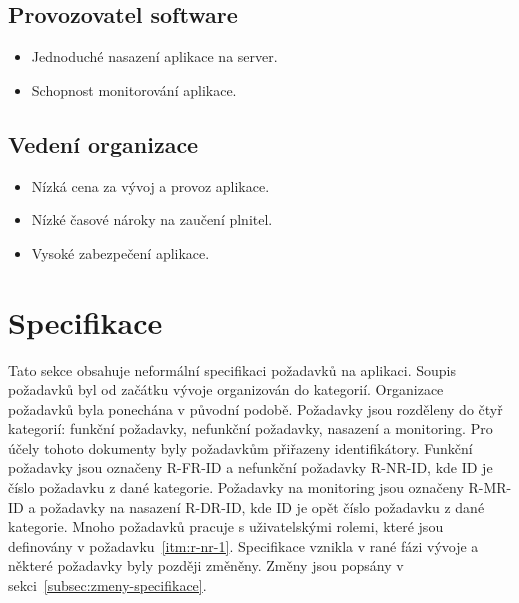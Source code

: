 \subsection*{Provozovatel software}\label{subsec:provozovatel-spravce-software}

\begin{itemize}
    \item
    Jednoduché nasazení aplikace na server.
    \item
    Schopnost monitorování aplikace.
\end{itemize}

\subsection*{Vedení organizace}\label{subsec:vedeni-organizace}

\begin{itemize}
    \item
    Nízká cena za vývoj a provoz aplikace.
    \item
    Nízké časové nároky na zaučení plnitel.
    \item
    Vysoké zabezpečení aplikace.
\end{itemize}


\section{Specifikace}\label{sec:specifikace}

Tato sekce obsahuje neformální specifikaci požadavků na aplikaci.
Soupis požadavků byl od začátku vývoje organizován do kategorií.
Organizace požadavků byla ponechána v původní podobě.
Požadavky jsou rozděleny do čtyř kategorií: funkční požadavky, nefunkční požadavky, nasazení a monitoring.
Pro účely tohoto dokumenty byly požadavkům přiřazeny identifikátory.
Funkční požadavky jsou označeny R-FR-ID a nefunkční požadavky R-NR-ID, kde ID je číslo požadavku z dané kategorie.
Požadavky na monitoring jsou označeny R-MR-ID a požadavky na nasazení R-DR-ID, kde ID je opět číslo požadavku z dané kategorie.
Mnoho požadavků pracuje s uživatelskými rolemi, které jsou definovány v požadavku~\ref{itm:r-nr-1}.
Specifikace vznikla v rané fázi vývoje a některé požadavky byly později změněny.
Změny jsou popsány v sekci~\ref{subsec:zmeny-specifikace}.

